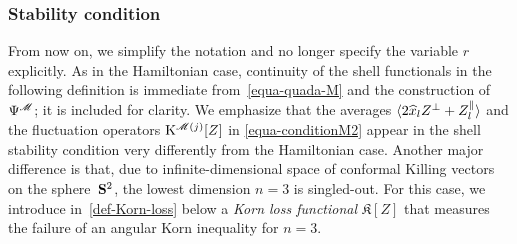 \documentclass[11pt]{article}
\numberwithin{table}{section}
\numberwithin{equation}{section}
\numberwithin{table}{section}
\numberwithin{figure}{section}
\begin{document}
\subsubsection{Stability condition}

From now on, we simplify the notation and no longer specify the variable $r$ explicitly.  As in the Hamiltonian case, continuity of the shell functionals in the following definition is immediate from~\eqref{equa-quada-M} and the construction of~$\Psi^{\mathscr{M}}$; it is included for clarity. We emphasize that the averages $\langle 2\widehat{x}_lZ^{\perp}+Z^{\parallel}_l\rangle$ and the fluctuation operators $\mathrm{K}^{\mathscr{M}(j)}[Z]$ in \eqref{equa-conditionM2} appear in the shell stability condition very differently from the Hamiltonian case.
Another major difference is that, due to infinite-dimensional space of conformal Killing vectors on the sphere~$\mathbf{S}^2$, the lowest dimension $n=3$ is singled-out.
For this case, we introduce in~\eqref{def-Korn-loss} below a \emph{Korn loss functional} $\mathfrak{K}[Z]$ that measures the failure of an angular Korn inequality for $n=3$.
\end{document}

